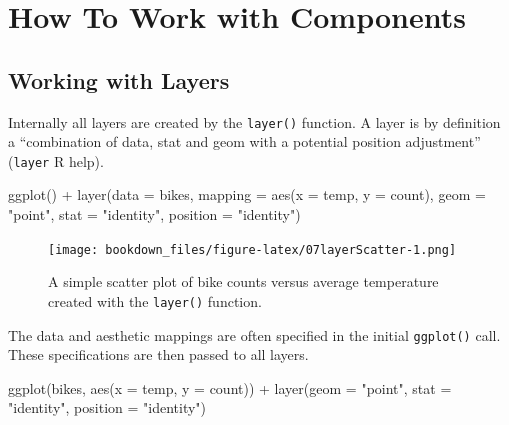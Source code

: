 \documentclass[
]{krantz}
\makeatletter
\newenvironment{Shaded}{\begin{snugshade}}{\end{snugshade}}
\newcommand{\AttributeTok}[1]{\textcolor[rgb]{0.61,0.61,0.61}{#1}}
\newcommand{\FunctionTok}[1]{\textcolor[rgb]{0,0,0}{#1}}
\newcommand{\NormalTok}[1]{#1}
\newcommand{\SpecialCharTok}[1]{\textcolor[rgb]{0,0,0}{#1}}
\newcommand{\StringTok}[1]{\textcolor[rgb]{0.5,0.5,0.5}{#1}}
\newenvironment{kframe}{%
\medskip{}
\setlength{\fboxsep}{.8em}
 \def\at@end@of@kframe{}%
 \ifinner\ifhmode%
  \def\at@end@of@kframe{\end{minipage}}%
  \begin{minipage}{\columnwidth}%
 \fi\fi%
 \def\FrameCommand##1{\hskip\@totalleftmargin \hskip-\fboxsep
 \colorbox{shadecolor}{##1}\hskip-\fboxsep
     \hskip-\linewidth \hskip-\@totalleftmargin \hskip\columnwidth}%
 \MakeFramed {\advance\hsize-\width
   \@totalleftmargin\z@ \linewidth\hsize
   \@setminipage}}%
 {\par\unskip\endMakeFramed%
 \at@end@of@kframe}
\renewenvironment{Shaded}{\begin{kframe}}{\end{kframe}}
\makeatother
\begin{document}
\hypertarget{part-how-to-work-with-components}{%
\part{How To Work with Components}\label{part-how-to-work-with-components}}

\hypertarget{working-with-layers}{%
\chapter{Working with Layers}\label{working-with-layers}}

Internally all layers are created by the \texttt{layer()} function. A layer is by definition a ``combination of data, stat and geom with a potential position adjustment'' (\texttt{layer} R help).

\begin{Shaded}
\begin{Highlighting}[]
\FunctionTok{ggplot}\NormalTok{() }\SpecialCharTok{+}
  \FunctionTok{layer}\NormalTok{(}\AttributeTok{data =}\NormalTok{ bikes, }\AttributeTok{mapping =} \FunctionTok{aes}\NormalTok{(}\AttributeTok{x =}\NormalTok{ temp, }\AttributeTok{y =}\NormalTok{ count),}
        \AttributeTok{geom =} \StringTok{"point"}\NormalTok{, }\AttributeTok{stat =} \StringTok{"identity"}\NormalTok{, }\AttributeTok{position =} \StringTok{"identity"}\NormalTok{)}
\end{Highlighting}
\end{Shaded}

\begin{figure}
\centering
\texttt{[image: bookdown\_files/figure-latex/07layerScatter-1.png]}
\caption{\label{fig:07layerScatter}A simple scatter plot of bike counts versus average temperature created with the \texttt{layer()} function.}
\end{figure}

The data and aesthetic mappings are often specified in the initial \texttt{ggplot()} call. These specifications are then passed to all layers.

\begin{Shaded}
\begin{Highlighting}[]
\FunctionTok{ggplot}\NormalTok{(bikes, }\FunctionTok{aes}\NormalTok{(}\AttributeTok{x =}\NormalTok{ temp, }\AttributeTok{y =}\NormalTok{ count)) }\SpecialCharTok{+}
  \FunctionTok{layer}\NormalTok{(}\AttributeTok{geom =} \StringTok{"point"}\NormalTok{, }\AttributeTok{stat =} \StringTok{"identity"}\NormalTok{, }\AttributeTok{position =} \StringTok{"identity"}\NormalTok{)}
\end{Highlighting}
\end{Shaded}
\end{document}
